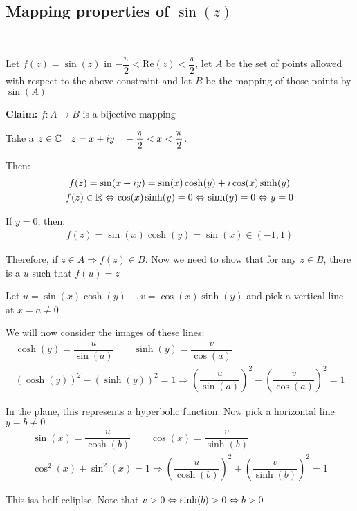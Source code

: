 \subsection{Mapping properties of $\sin(z)$}\hfill\\\par
\noindent Let $f(z) = \sin(z)$ in $-\dfrac{\pi}{2}<\text{Re}(z)<\dfrac{\pi}{2}$, let $A$ be the set of points allowed with respect to the above constraint and let $B$ be the mapping of those points by $\sin(A)$
\par\bigskip
\noindent\textbf{Claim:} $f:A\to B$ is a bijective mapping
\newpage
\begin{prf}[]{}
  Take a $z\in\mathbb{C}\quad z = x+iy\quad -\dfrac{\pi}{2}<x<\dfrac{\pi}{2}$.\par
  \noindent Then:
  \begin{equation*}
    \begin{gathered}
      f(z) = \sin(x+iy)= \sin(x)\cosh(y)+i\cos(x)\sinh(y)\\
      f(z)\in\mathbb{R}\Leftrightarrow \cos(x)\sinh(y) = 0 \Leftrightarrow \sinh(y)=0\Leftrightarrow y=0
    \end{gathered}
  \end{equation*}\par
  \noindent If $y=0$, then:
  \begin{equation*}
    \begin{gathered}
      f(z) = \sin(x)\cosh(y) = \sin(x)\in(-1,1)
    \end{gathered}
  \end{equation*}
  \par\bigskip
  \noindent Therefore, if $z\in A\Rightarrow f(z)\in B$. Now we need to show that for any $z\in B$, there is a $u$ such that $f(u) = z$
  \par\bigskip
  \noindent Let $u = \sin(x)\cosh(y)\quad, v = \cos(x)\sinh(y)$ and pick a vertical line at $x = a\neq0$\par
  \noindent We will now consider the images of these lines:
  \begin{equation*}
    \begin{gathered}
      \cosh(y) = \dfrac{u}{\sin(a)}\qquad\sinh(y) = \dfrac{v}{\cos(a)}\\
      (\cosh(y))^2-(\sinh(y))^2 = 1\Rightarrow \left(\dfrac{u}{\sin(a)}\right)^2-\left(\dfrac{v}{\cos(a)}\right)^2 = 1
    \end{gathered}
  \end{equation*}
  \par\bigskip
  \noindent In the plane, this represents a hyperbolic function. Now pick a horizontal line $y = b\neq0$
  \begin{equation*}
    \begin{gathered}
      \sin(x) = \dfrac{u}{\cosh(b)}\qquad\cos(x) = \dfrac{v}{\sinh(b)}\\
      \cos^2(x)+\sin^2(x) =1\Rightarrow \left(\dfrac{u}{\cosh(b)}\right)^2+\left(\dfrac{v}{\sinh(b)}\right)^2=1
    \end{gathered}
  \end{equation*}
  \par\bigskip
  \noindent This isa  half-ecliplse. Note that $v>0\Leftrightarrow \sinh(b)>0\Leftrightarrow b>0$
  \par\bigskip
\end{prf}
\par\bigskip
